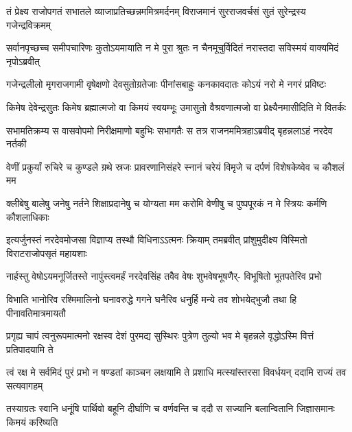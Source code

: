 \fourlineindentedshloka
{तं प्रेक्ष्य राजोपगतं सभातले}
{व्याजाप्रतिच्छन्नममित्रमर्दनम्}
{विराजमानं सुरराजवर्चसं सुतं}
{सुरेन्द्रस्य गजेन्द्रविक्रमम्}


\fourlineindentedshloka
{सर्वानपृच्छच्च समीपचारिणः}
{कुतोऽयमायाति न मे पुरा श्रुतः}
{न चैनमूचुर्विदितं नरास्तदा}
{सविस्मयं वाक्यमिदं नृपोऽब्रवीत्}




\fourlineindentedshloka
{गजेन्द्रलीलो मृगराजगामी}
{वृषेक्षणो देवसुतोग्रतेजाः}
{पीनांसबाहुः कनकावदातः}
{कोऽयं नरो मे नगरं प्रविष्टः}


\fourlineindentedshloka
{किमेष देवेन्द्रसुतः किमेष}
{ब्रह्मात्मजो वा किमयं स्वयम्भूः}
{उमासुतो वैश्रवणात्मजो वा}
{प्रेक्ष्यैनमासीदिति मे वितर्कः}



\fourlineindentedshloka
{सभामतिक्रम्य स वासवोपमो}
{निरीक्षमाणो बहुभिः सभागतैः}
{स तत्र राजनममित्रहाऽब्रवीद्}
{बृहन्नलाऽहं नरदेव नर्तकी}


\fourlineindentedshloka
{वेणीं प्रकुर्यां रुचिरे च कुण्डले}
{ग्रथे स्रजः प्रावरणानिसंहरे}
{स्नानं चरेयं विमृजे च दर्पणं}
{विशेषकेष्वेव च कौशलं मम}


\fourlineindentedshloka
{क्लीबेषु बालेषु जनेषु नर्तने}
{शिक्षाप्रदानेषु च योग्यता मम}
{करोमि वेणीषु च पुष्पपूरकं}
{न मे स्त्रियः कर्मणि कौशलाधिकाः}


\fourlineindentedshloka
{इत्यर्जुनस्तं नरदेवमोजसा}
{विज्ञाप्य तस्थौ विधिनाऽऽत्मनः क्रियाम्}
{तमब्रवीत् प्रांशुमुदीक्ष्य विस्मितो}
{विराटराजोपसृतं महायशाः}


\fourlineindentedshloka
{नार्हस्तु वेषोऽयमनूर्जितस्ते}
{नापुंस्त्वमर्हं नरदेवसिंह}
{तवैव वेषः शुभवेषभूषणैर्-}
{विभूषितो भूतपतेरिव प्रभो}


\fourlineindentedshloka
{विभाति भानोरिव रश्मिमालिनो}
{घनावरुद्धे गगने घनैरिव}
{धनुर्हि मन्ये तव शोभयेद्भुजौ}
{तथा हि पीनावतिमात्रमायतौ}


\fourlineindentedshloka
{प्रगृह्य चापं त्वनुरूपमात्मनो}
{रक्षस्व देशं पुरमद्य सुस्थिरः}
{पुत्रेण तुल्यो भव मे बृहन्नले}
{वृद्धोऽस्मि वित्तं प्रतिपादयामि ते}


\fourlineindentedshloka
{त्वं रक्ष मे सर्वमिदं पुरं प्रभो}
{न षण्डतां काञ्चन लक्षयामि ते}
{प्रशाधि मत्स्यांस्तरसा विवर्धयन्}
{ददामि राज्यं तव सत्यवागहम्}



\fourlineindentedshloka
{तस्याग्रतः स्वानि धनूंषि पार्थिवो}
{बहूनि दीर्घाणि च वर्णवन्ति च}
{ददौ स सज्यानि बलान्वितानि}
{जिज्ञासमानः किमयं करिष्यति}


